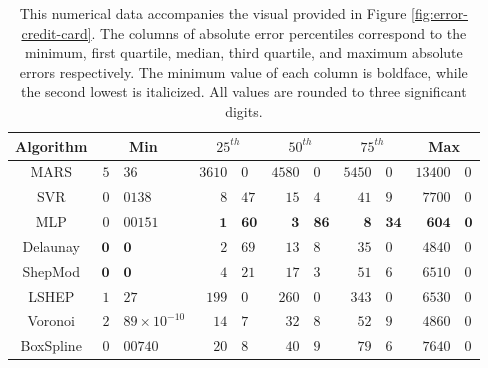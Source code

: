 \documentclass[smallextended,final]{svjour3}  %
\begin{document}
\begin{appendix}
\begin{table}
  \centering
  \begin{tabular}{c|r@{.}l|r@{.}l|r@{.}l|r@{.}l|r@{.}l}
    \hline
    Algorithm & \multicolumn{2}{c|}{Min} & \multicolumn{2}{c|}{$25^{th}$} & \multicolumn{2}{c|}{$50^{th}$} & \multicolumn{2}{c|}{$75^{th}$} & \multicolumn{2}{c}{Max}\\
    \hline
    MARS & $5$&$36$ & $3610$&$0$ & $4580$&$0$ & $5450$&$0$ & $13400$&$0$\\
    SVR & $0$&$0138$ & $8$&$47$ & $15$&$4$ & $41$&$9$ & $7700$&$0$\\
    MLP & $0$&$00151$ & $\mathbf{1}$&$\mathbf{60}$ & $\mathbf{3}$&$\mathbf{86}$ & $\mathbf{8}$&$\mathbf{34}$ & $\mathbf{604}$&$\mathbf{0}$\\
    Delaunay & $\mathbf{0}$&$\mathbf{0}$ & $\mathit{2}$&$\mathit{69}$ & $\mathit{13}$&$\mathit{8}$ & $\mathit{35}$&$\mathit{0}$ & $\mathit{4840}$&$\mathit{0}$\\
    ShepMod & $\mathbf{0}$&$\mathbf{0}$ & $4$&$21$ & $17$&$3$ & $51$&$6$ & $6510$&$0$\\
    LSHEP & $1$&$27$ & $199$&$0$ & $260$&$0$ & $343$&$0$ & $6530$&$0$\\
    Voronoi & $\mathit{2}$&$\mathit{89 \times 10^{-10}}$ & $14$&$7$ & $32$&$8$ & $52$&$9$ & $4860$&$0$\\
    BoxSpline & $0$&$00740$ & $20$&$8$ & $40$&$9$ & $79$&$6$ & $7640$&$0$\\
    \hline
  \end{tabular}
  \caption{This numerical data accompanies the visual provided in
    Figure \ref{fig:error-credit-card}. The columns of absolute error
    percentiles correspond to the minimum, first quartile, median,
    third quartile, and maximum absolute errors respectively. The
    minimum value of each column is boldface, while the second lowest
    is italicized. All values are rounded to three significant
    digits.}
  \label{table:error-credit-card}
\end{table}


\end{appendix}
\end{document}
